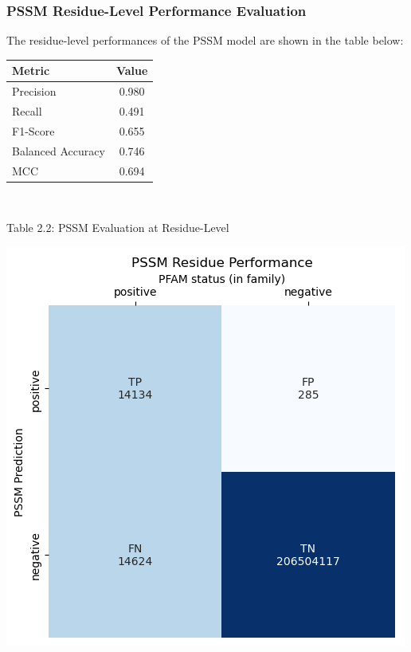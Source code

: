 \documentclass[10pt,twocolumn,letterpaper]{article}
\begin{document}
\subsubsection{PSSM Residue-Level Performance Evaluation}

The residue-level performances of the PSSM model are shown in the table below:


\begin{center}
    \begin{tabular}{lc}
        \toprule
        Metric & Value \\
        \midrule
        Precision & 0.980 \\
        Recall & 0.491 \\
        F1-Score & 0.655 \\
        Balanced Accuracy & 0.746 \\
        MCC & 0.694 \\
        \bottomrule
    \end{tabular}
\end{center} \\

\begin{center}
    \small{Table 2.2: PSSM Evaluation at Residue-Level}
\end{center}

\begin{center}
    \includegraphics[scale=0.45]{report/img/pssm_res_performance.png}
\end{center}
\end{document}
